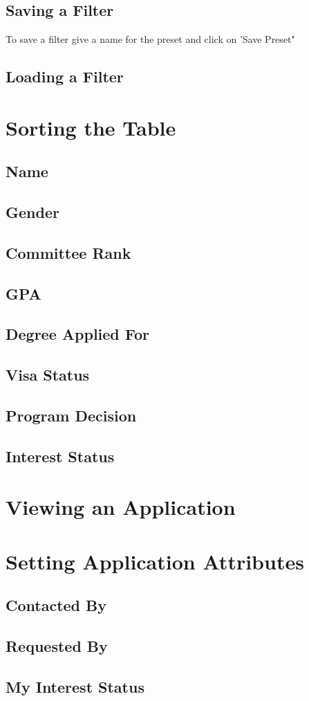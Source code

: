 \documentclass[fontsize=12pt,paper=letter,twoside]{scrartcl}
\begin{document}
\clearpage 
\subsection{Saving a Filter}
To save a filter give a name for the preset and click on 'Save Preset"
\subsection{Loading a Filter}
\section{Sorting the Table}
\subsection{Name}
\subsection{Gender}
\subsection{Committee Rank}
\subsection{GPA}
\subsection{Degree Applied For}
\subsection{Visa Status}
\subsection{Program Decision}
\subsection{Interest Status}
\section{Viewing an Application}
\section{Setting Application Attributes}
\subsection{Contacted By}
\subsection{Requested By}
\subsection{My Interest Status}
\end{document}
